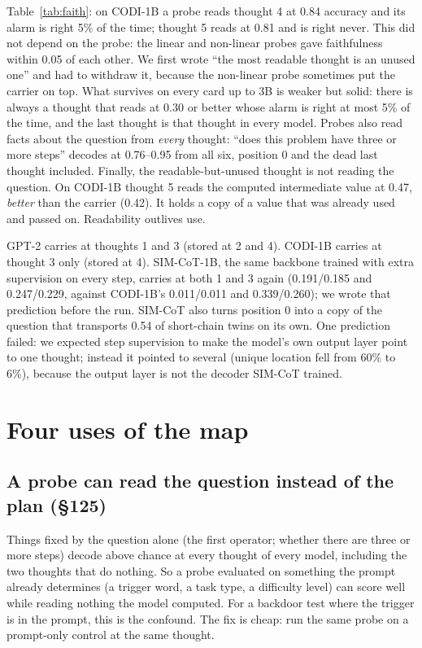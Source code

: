 \documentclass{article}
\begin{document}
\begin{finding}
Table~\ref{tab:faith}: on CODI-1B a probe reads thought 4 at 0.84 accuracy and its alarm is right 5\% of the time; thought 5 reads at 0.81 and is right never. This did not depend on the probe: the linear and non-linear probes gave faithfulness within 0.05 of each other. We first wrote ``the most readable thought is an unused one'' and had to withdraw it, because the non-linear probe sometimes put the carrier on top. What survives on every card up to 3B is weaker but solid: there is always a thought that reads at 0.30 or better whose alarm is right at most 5\% of the time, and the last thought is that thought in every model. Probes also read facts about the question from \emph{every} thought: ``does this problem have three or more steps'' decodes at 0.76--0.95 from all six, position 0 and the dead last thought included. Finally, the readable-but-unused thought is not reading the question. On CODI-1B thought 5 reads the computed intermediate value at 0.47, \emph{better} than the carrier (0.42). It holds a copy of a value that was already used and passed on. Readability outlives use.
\end{finding}

\begin{finding}
GPT-2 carries at thoughts 1 and 3 (stored at 2 and 4). CODI-1B carries at thought 3 only (stored at 4). SIM-CoT-1B, the same backbone trained with extra supervision on every step, carries at both 1 and 3 again (0.191/0.185 and 0.247/0.229, against CODI-1B's 0.011/0.011 and 0.339/0.260); we wrote that prediction before the run. SIM-CoT also turns position 0 into a copy of the question that transports 0.54 of short-chain twins on its own. One prediction failed: we expected step supervision to make the model's own output layer point to one thought; instead it pointed to several (unique location fell from 60\% to 6\%), because the output layer is not the decoder SIM-CoT trained.
\end{finding}

\section{Four uses of the map}

\subsection{A probe can read the question instead of the plan (\S125)}
Things fixed by the question alone (the first operator; whether there are three or more steps) decode above chance at every thought of every model, including the two thoughts that do nothing. So a probe evaluated on something the prompt already determines (a trigger word, a task type, a difficulty level) can score well while reading nothing the model computed. For a backdoor test where the trigger is in the prompt, this is the confound. The fix is cheap: run the same probe on a prompt-only control at the same thought.
\end{document}
